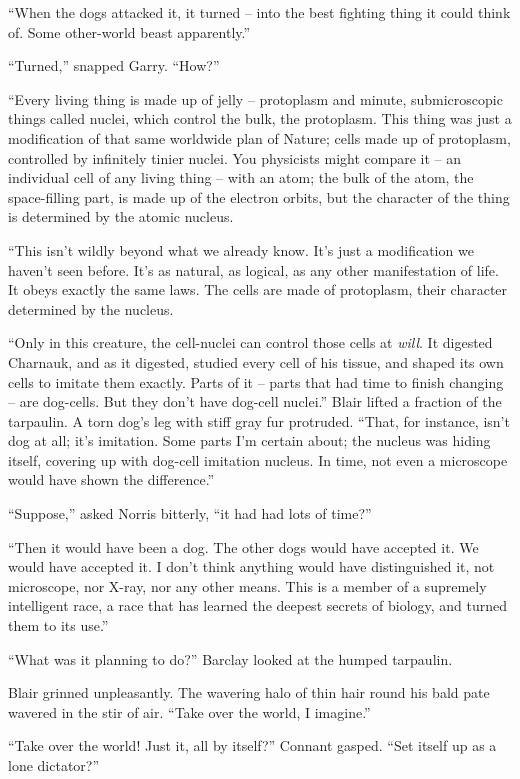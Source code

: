 \documentclass[letterpaper,openany,12pt]{memoir}		%
\begin{document}
``When the dogs attacked it, it turned -- into the best fighting thing it could
think of. Some other-world beast apparently.''

``Turned,'' snapped Garry. ``How?''

``Every living thing is made up of jelly -- protoplasm and minute,
submicroscopic things called nuclei, which control the bulk, the protoplasm.
This thing was just a modification of that same worldwide plan of Nature; cells
made up of protoplasm, controlled by infinitely tinier nuclei. You physicists
might compare it -- an individual cell of any living thing -- with an atom; the
bulk of the atom, the space-filling part, is made up of the electron orbits, but
the character of the thing is determined by the atomic nucleus.

``This isn't wildly beyond what we already know. It's just a modification we
haven't seen before. It's as natural, as logical, as any other manifestation of
life. It obeys exactly the same laws. The cells are made of protoplasm, their
character determined by the nucleus.

``Only in this creature, the cell-nuclei can control those cells at \emph{will}.
It digested Charnauk, and as it digested, studied every cell of his tissue, and
shaped its own cells to imitate them exactly. Parts of it -- parts that had time
to finish changing -- are dog-cells. But they don't have dog-cell nuclei.''
Blair lifted a fraction of the tarpaulin. A torn dog's leg with stiff gray fur
protruded. ``That, for instance, isn't dog at all; it's imitation. Some parts
I'm certain about; the nucleus was hiding itself, covering up with dog-cell
imitation nucleus. In time, not even a microscope would have shown the
difference.''

``Suppose,'' asked Norris bitterly, ``it had had lots of time?''

``Then it would have been a dog. The other dogs would have accepted it. We would
have accepted it. I don't think anything would have distinguished it, not
microscope, nor X-ray, nor any other means. This is a member of a supremely
intelligent race, a race that has learned the deepest secrets of biology, and
turned them to its use.''

``What was it planning to do?'' Barclay looked at the humped tarpaulin.

Blair grinned unpleasantly. The wavering halo of thin hair round his bald pate
wavered in the stir of air. ``Take over the world, I imagine.''

``Take over the world! Just it, all by itself?'' Connant gasped. ``Set itself up
as a lone dictator?''
\end{document}
